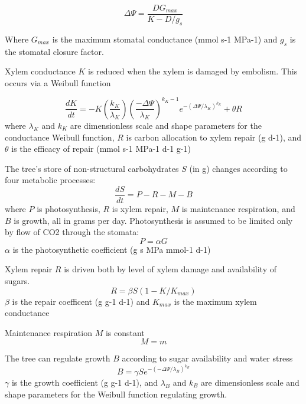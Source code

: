 \documentclass[12pt]{amsart}
\begin{document}
\begin{equation}\label{DPsi}
\Delta\Psi = \frac{DG_{max}}{K - D/g_s}
\end{equation}

Where $G_{max}$ is the maximum stomatal conductance (mmol s-1 MPa-1) and $g_s$ is the stomatal closure factor.

Xylem conductance $K$ is reduced when the xylem is damaged by embolism.  This occurs via a Weibull function

\begin{equation}\label{dK}
\frac{dK}{dt} = -K(\frac{k_K}{\lambda_K})(\frac{-\Delta\Psi}{\lambda_K})^{k_K-1}e^{-(\Delta\Psi/\lambda_K)^{k_K}} + \theta R
\end{equation}
where $\lambda_K$ and $k_K$ are dimensionless scale and shape parameters for the conductance Weibull function, $R$ is carbon allocation to xylem repair (g d-1), and $\theta$ is the efficacy of repair (mmol s-1 MPa-1 d-1 g-1)

The tree's store of non-structural carbohydrates $S$ (in g) changes according to four metabolic processes:
\begin{equation}\label{dS}
\frac{dS}{dt} = P - R - M - B
\end{equation}
where $P$ is photosynthesis, $R$ is xylem repair, $M$ is maintenance respiration, and $B$ is growth, all in grams per day.  Photosynthesis is assumed to be limited only by flow of CO2 through the stomata:
\begin{equation}\label{P}
P = \alpha G
\end{equation}
$\alpha$ is the photosynthetic coefficient (g s MPa mmol-1 d-1)

Xylem repair $R$ is driven both by level of xylem damage and availability of sugars.
\begin{equation}\label{R}
R = \beta S (1 - K/K_{max})
 \end{equation}
 $\beta$ is the repair coefficent (g g-1 d-1) and $K_{max}$ is the maximum xylem conductance

Maintenance respiration $M$ is constant
\begin{equation}\label{M}
M = m
\end{equation}
 
The tree can regulate growth $B$ according to sugar availability and water stress
 \begin{equation}\label{B}
 B = \gamma S e^{-(-\Delta\Psi/\lambda_B)^{k_B}}
\end{equation}
$\gamma$ is the growth coefficient (g g-1 d-1), and $\lambda_B$ and $k_B$ are dimensionless scale and shape parameters for the Weibull function regulating growth.   
 
\end{document}
